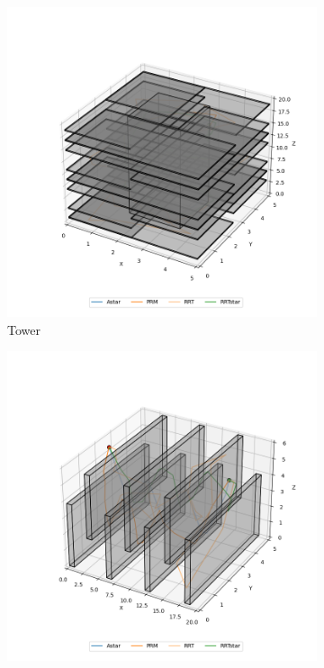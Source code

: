 \documentclass[conference]{IEEEtran}
\begin{document}
\begin{figure}[htbp]
    \begin{subfigure}[b]{0.3\textwidth}
        \centering
        \includegraphics[width=\textwidth]{img/tower.png}
        \caption{Tower}
    \end{subfigure}
    \hfill
    \begin{subfigure}[b]{0.3\textwidth}
        \centering
        \includegraphics[width=\textwidth]{img/flappy_bird.png}

\end{subfigure}
\end{figure}
\end{document}
